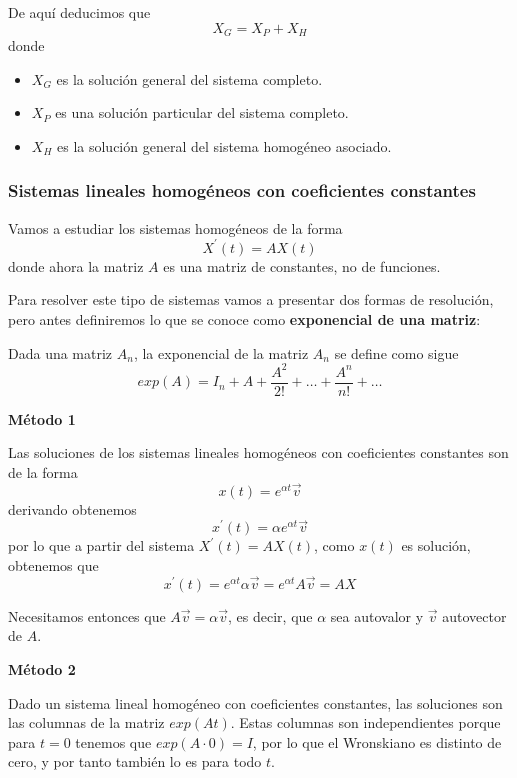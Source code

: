 De aquí deducimos que $$X_G = X_P+X_H$$
donde 
\begin{itemize}
\item $X_G$ es la solución general del sistema completo.

\item $X_P$ es una solución particular del sistema completo.

\item $X_H$ es la solución general del sistema homogéneo asociado.
\end{itemize}

\subsubsection{Sistemas lineales homogéneos con coeficientes constantes}
Vamos a estudiar los sistemas homogéneos de la forma $$X^\prime(t) = AX(t)$$
donde ahora la matriz $A$ es una matriz de constantes, no de funciones.

Para resolver este tipo de sistemas vamos a presentar dos formas de resolución, pero antes definiremos lo que se conoce como \textbf{exponencial de una matriz}:

\begin{definition}

Dada una matriz $A_n$, la exponencial de la matriz $A_n$ se define como sigue
$$exp(A) = I_n + A + \frac{A^2}{2!} + \hdots + \frac{A^n}{n!} + \hdots$$

\end{definition}

\vspace{5mm}
\noindent\textbf{Método 1}

Las soluciones de los sistemas lineales homogéneos con coeficientes constantes son de la forma $$x(t) = e^{\alpha t}\vec{v}$$
derivando obtenemos $$x^\prime(t) = \alpha e^{\alpha t}\vec{v}$$ por lo que a partir del sistema $X^\prime(t) = AX(t)$, como $x(t)$ es solución, obtenemos que $$x^\prime(t) = e^{\alpha t}\alpha\vec{v} = e^{\alpha t}A\vec{v} = AX$$

Necesitamos entonces que $A\vec{v} = \alpha\vec{v}$, es decir, que $\alpha$ sea autovalor y $\vec{v}$ autovector de $A$.

\vspace{5mm}
\noindent\textbf{Método 2}

Dado un sistema lineal homogéneo con coeficientes constantes, las soluciones son las columnas de la matriz $exp(At)$. Estas columnas son independientes porque para $t=0$ tenemos que $exp(A\cdot0) = I$, por lo que el Wronskiano es distinto de cero, y por tanto también lo es para todo $t$.

